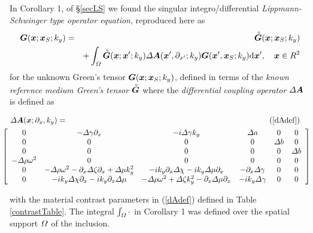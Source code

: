 In Corollary 1, of \S\ref{secLS} we found the singular 
integro/differential {\em Lippmann-Schwinger type operator 
equation\/}, reproduced here as
\begin{eqnarray} \label{LSTrep}
{{\mbox{\boldmath$\mit G$\unboldmath}}}({\mbox{\boldmath$\mit x$\unboldmath}};{\mbox{\boldmath$\mit x$\unboldmath}}_{S};k_y)&=&
{\stackrel{\scriptscriptstyle _{\,\,\circ}}{ \mbox{\boldmath$\mit G$\unboldmath}}}({\mbox{\boldmath$\mit x$\unboldmath}};{\mbox{\boldmath$\mit x$\unboldmath}}_{S};k_y)\nonumber\\
&&+\int_{{\mit \Omega}} {\stackrel{\scriptscriptstyle _{\,\,\circ}}{ \mbox{\boldmath$\mit G$\unboldmath}}}({\mbox{\boldmath$\mit x$\unboldmath}};{\mbox{\boldmath$\mit x$\unboldmath}}^{\prime};k_y)
{\mit \Delta} {\mbox{\boldmath$\mit A$\unboldmath}}({\mbox{\boldmath$\mit x$\unboldmath}}^{\prime},\partial_{{x}^{\prime}};k_y) {\mbox{\boldmath$\mit G$\unboldmath}}({\mbox{\boldmath$\mit x$\unboldmath}}^{\prime},{\mbox{\boldmath$\mit x$\unboldmath}}_{S};k_y) {\rm d}{\mbox{\boldmath$\mit x$\unboldmath}}^{\prime},
\quad {\mbox{\boldmath$\mit x$\unboldmath}}\in R^{2}
\end{eqnarray}
for the unknown Green's tensor ${{\mbox{\boldmath$\mit G$\unboldmath}}}({\mbox{\boldmath$\mit x$\unboldmath}};{\mbox{\boldmath$\mit x$\unboldmath}}_{S};k_y)$, defined in terms of the {\em known reference medium Green's 
tensor\/} 
${\stackrel{\scriptscriptstyle _{\,\,\circ}}{ \mbox{\boldmath$\mit G$\unboldmath}}}$ where the {\em differential coupling operator\/}  ${{\mit 
\Delta} {\mbox{\boldmath$\mit A$\unboldmath}}}$ is 
defined as 
\begin{samepage}
\begin{eqnarray*}
\lefteqn{
{{\mit \Delta} {\bmi A}}({\bmi x};{\partial }_{x},{k}_{y})
=\hspace{26em}(\ref{dAdef})}\\
&&\!\!\!\!\!\!\!\!\!\!\!\!
\left[{\begin{array}{cccccc}
0&- {{\mit \Delta} \gamma} {\partial }_{  x}&  
-i {{\mit \Delta} \gamma} {  k}_{  y}&  {{\mit \Delta} a}&0&0\\0&0&0&0&{{\mit \Delta} b}&0\\0&0&0&0&0&{{\mit \Delta} b}\\ - {{\mit \Delta} \rho} {\omega }^{  
2}&  0&0&0&0&0\\ 0&- {{\mit \Delta} \rho} {\omega 
}^{  2}  -{ \partial }_{x} {{\mit \Delta} \zeta} {\partial }_{  
x}  + {{\mit \Delta} \mu} {  k}_{  y}^{  2}&  
-i{k}_{y}{ \partial }_{x} {{\mit \Delta} \chi}   -i{k}_{y} {{\mit \Delta} \mu} {\partial 
}_{  x}&  -{ \partial }_{x} {{\mit \Delta} \gamma} &  0&0\\ 
0&-i{k}_{y} {{\mit \Delta} \chi} {\partial }_{  x}  -i{k}_{y}{ \partial 
}_{x} {{\mit \Delta} \mu} &  - {{\mit \Delta} \rho} {\omega }^{  2}  + {{\mit \Delta} \zeta }
{  k}_{  y}^{  2}  -{ \partial }_{x} {{\mit \Delta} \mu} 
{\partial }_{  x}&  -i{k}_{y} {{\mit \Delta} \gamma} &  0&0\end{array}}\right]
\end{eqnarray*}
\end{samepage}
with the material contrast parameters in (\ref{dAdef}) defined in Table \ref{contrastTable}.
 The integral $\int_{{\mit \Omega}} \cdot$ in Corollary 1
was defined over the spatial support ${\mit \Omega}$ of the inclusion.

